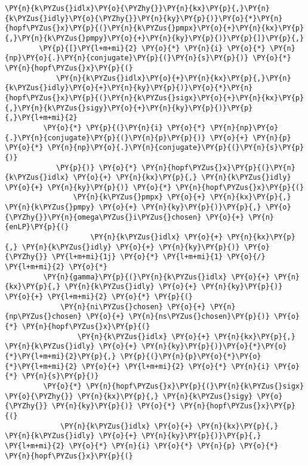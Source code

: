 \begin{Verbatim}[commandchars=\\\{\}]
                 \PY{n}{k\PYZus{}idlx}\PY{o}{\PYZhy{}}\PY{n}{kx}\PY{p}{,}\PY{n}{k\PYZus{}idly}\PY{o}{\PYZhy{}}\PY{n}{ky}\PY{p}{)}\PY{o}{*}\PY{n}{hopf\PYZus{}x}\PY{p}{(}\PY{n}{k\PYZus{}pmpx}\PY{o}{+}\PY{n}{kx}\PY{p}{,}\PY{n}{k\PYZus{}pmpy}\PY{o}{+}\PY{n}{ky}\PY{p}{)}\PY{p}{]}\PY{p}{,}
        \PY{p}{[}\PY{l+m+mi}{2} \PY{o}{*} \PY{n}{i} \PY{o}{*} \PY{n}{np}\PY{o}{.}\PY{n}{conjugate}\PY{p}{(}\PY{n}{s}\PY{p}{)} \PY{o}{*} \PY{n}{hopf\PYZus{}x}\PY{p}{(}
            \PY{n}{k\PYZus{}idlx}\PY{o}{+}\PY{n}{kx}\PY{p}{,}\PY{n}{k\PYZus{}idly}\PY{o}{+}\PY{n}{ky}\PY{p}{)}\PY{o}{*}\PY{n}{hopf\PYZus{}x}\PY{p}{(}\PY{n}{k\PYZus{}sigx}\PY{o}{+}\PY{n}{kx}\PY{p}{,}\PY{n}{k\PYZus{}sigy}\PY{o}{+}\PY{n}{ky}\PY{p}{)}\PY{p}{,}\PY{l+m+mi}{2}
         \PY{o}{*} \PY{p}{(}\PY{n}{i} \PY{o}{*} \PY{n}{np}\PY{o}{.}\PY{n}{conjugate}\PY{p}{(}\PY{n}{p}\PY{p}{)} \PY{o}{+} \PY{n}{p} \PY{o}{*} \PY{n}{np}\PY{o}{.}\PY{n}{conjugate}\PY{p}{(}\PY{n}{s}\PY{p}{)}
            \PY{p}{)} \PY{o}{*} \PY{n}{hopf\PYZus{}x}\PY{p}{(}\PY{n}{k\PYZus{}idlx} \PY{o}{+} \PY{n}{kx}\PY{p}{,} \PY{n}{k\PYZus{}idly} \PY{o}{+} \PY{n}{ky}\PY{p}{)} \PY{o}{*} \PY{n}{hopf\PYZus{}x}\PY{p}{(}
                \PY{n}{k\PYZus{}pmpx} \PY{o}{+} \PY{n}{kx}\PY{p}{,} \PY{n}{k\PYZus{}pmpy} \PY{o}{+} \PY{n}{ky}\PY{p}{)}\PY{p}{,} \PY{o}{\PYZhy{}}\PY{n}{omega\PYZus{}i\PYZus{}chosen} \PY{o}{+} \PY{n}{enLP}\PY{p}{(}
                    \PY{n}{k\PYZus{}idlx} \PY{o}{+} \PY{n}{kx}\PY{p}{,} \PY{n}{k\PYZus{}idly} \PY{o}{+} \PY{n}{ky}\PY{p}{)} \PY{o}{\PYZhy{}} \PY{l+m+mi}{1j} \PY{o}{*} \PY{l+m+mi}{1} \PY{o}{/} \PY{l+m+mi}{2} \PY{o}{*}
         \PY{n}{gamma}\PY{p}{(}\PY{n}{k\PYZus{}idlx} \PY{o}{+} \PY{n}{kx}\PY{p}{,} \PY{n}{k\PYZus{}idly} \PY{o}{+} \PY{n}{ky}\PY{p}{)} \PY{o}{+} \PY{l+m+mi}{2} \PY{o}{*} \PY{p}{(}
             \PY{n}{ni\PYZus{}chosen} \PY{o}{+} \PY{n}{np\PYZus{}chosen} \PY{o}{+} \PY{n}{ns\PYZus{}chosen}\PY{p}{)} \PY{o}{*} \PY{n}{hopf\PYZus{}x}\PY{p}{(}
                 \PY{n}{k\PYZus{}idlx} \PY{o}{+} \PY{n}{kx}\PY{p}{,} \PY{n}{k\PYZus{}idly} \PY{o}{+} \PY{n}{ky}\PY{p}{)}\PY{o}{*}\PY{o}{*}\PY{l+m+mi}{2}\PY{p}{,} \PY{p}{(}\PY{n}{p}\PY{o}{*}\PY{o}{*}\PY{l+m+mi}{2} \PY{o}{+} \PY{l+m+mi}{2} \PY{o}{*} \PY{n}{i} \PY{o}{*} \PY{n}{s}\PY{p}{)}
         \PY{o}{*} \PY{n}{hopf\PYZus{}x}\PY{p}{(}\PY{n}{k\PYZus{}sigx} \PY{o}{\PYZhy{}} \PY{n}{kx}\PY{p}{,} \PY{n}{k\PYZus{}sigy} \PY{o}{\PYZhy{}} \PY{n}{ky}\PY{p}{)} \PY{o}{*} \PY{n}{hopf\PYZus{}x}\PY{p}{(}
             \PY{n}{k\PYZus{}idlx} \PY{o}{+} \PY{n}{kx}\PY{p}{,} \PY{n}{k\PYZus{}idly} \PY{o}{+} \PY{n}{ky}\PY{p}{)}\PY{p}{,} \PY{l+m+mi}{2} \PY{o}{*} \PY{n}{i} \PY{o}{*} \PY{n}{p} \PY{o}{*} \PY{n}{hopf\PYZus{}x}\PY{p}{(}

\end{Verbatim}
